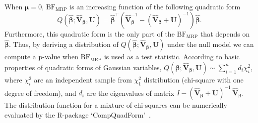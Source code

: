\documentclass{nature}
\def\bs{\boldsymbol}
\begin{document}
When $\bs \mu=0$, $\textrm{BF}_{\textrm{MRP}}$ is an increasing function of the following quadratic form
\begin{equation}\label{quadratic_form}
Q(\bs{\widehat{\beta}};\widehat{\mathbf{\textrm{V}}}_{{\bs {\beta}}},\mathbf{U})=
\bs{\widehat{\beta}^\intercal} \left(\widehat{\mathbf{\textrm{V}}}_{{\bs {\beta}}}^{-1} - (\widehat{\mathbf{\textrm{V}}}_{{\bs {\beta}}}+\mathbf{U})^{-1}\right) \bs{\widehat{\beta}}.
\end{equation}
Furthermore, this quadratic form is the only part of the $\textrm{BF}_{\textrm{MRP}}$ that depends on $\bs {\widehat{\beta}}$.
Thus, by deriving a distribution of $Q(\bs{\widehat{\beta}};\widehat{\mathbf{\textrm{V}}}_{{\bs {\beta}}},\mathbf{U})$
under the null model we can compute a p-value when $\textrm{BF}_{\textrm{MRP}}$ is used as a test statistic.
According to basic properties of quadratic forms of Gaussian variables,
$Q(\bs{\widehat{\beta}};\widehat{\mathbf{\textrm{V}}}_{{\bs {\beta}}},\mathbf{U}) \sim \sum_{i=1}^n d_i \chi^2_i$, where $\chi_i^2$
are an independent sample from $\chi_1^2$ distribution (chi-square with one degree of freedom),
and $d_i$ are the eigenvalues of matrix
$I-(\widehat{\mathbf{\textrm{V}}}_{{\bs {\beta}}}+\mathbf{U})^{-1}\, \widehat{\mathbf{\textrm{V}}}_{{\bs {\beta}}}$.
The distribution function for a mixture of chi-squares can be numerically evaluated by
the R-package `CompQuadForm'~\cite{Duchesne2010}.
\end{document}

